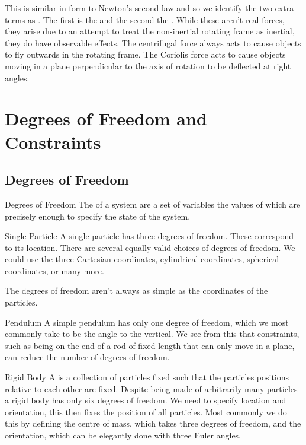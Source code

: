\documentclass[fleqn]{NotesClass}
\begin{document}
    This is similar in form to Newton's second law and so we identify the two extra terms as .
    The first is the  and the second the .
    While these aren't real forces, they arise due to an attempt to treat the non-inertial rotating frame as inertial, they do have observable effects.
    The centrifugal force always acts to cause objects to fly outwards in the rotating frame.
    The Coriolis force acts to cause objects moving in a plane perpendicular to the axis of rotation to be deflected at right angles.
    
    \chapter{Degrees of Freedom and Constraints}
    \section{Degrees of Freedom}
    \begin{dfn}{Degrees of Freedom}{}
        The  of a system are a set of variables the values of which are precisely enough to specify the state of the system.
    \end{dfn}
    
    \begin{exm}{Single Particle}{}
        A single particle has three degrees of freedom.
        These correspond to its location.
        There are several equally valid choices of degrees of freedom.
        We could use the three Cartesian coordinates, cylindrical coordinates, spherical coordinates, or many more.
    \end{exm}
    
    The degrees of freedom aren't always as simple as the coordinates of the particles.
    
    \begin{exm}{Pendulum}{}
        A simple pendulum has only one degree of freedom, which we most commonly take to be the angle to the vertical.
        We see from this that constraints, such as being on the end of a rod of fixed length that can only move in a plane, can reduce the number of degrees of freedom.
    \end{exm}
    
    \begin{exm}{Rigid Body}{}
        A  is a collection of particles fixed such that the particles positions relative to each other are fixed.
        Despite being made of arbitrarily many particles a rigid body has only six degrees of freedom.
        We need to specify location and orientation, this then fixes the position of all particles.
        Most commonly we do this by defining the centre of mass, which takes three degrees of freedom, and the orientation, which can be elegantly done with three Euler angles.
    \end{exm}
    
\end{document}
